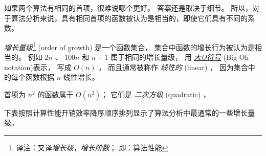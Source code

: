 
如果两个算法有相同的首项，很难说哪个更好。 答案还是取决于细节。
所以，对于算法分析来说，具有相同首项的函数被认为是相当的，即使它们具有不同的系数。


{\em 增长量级}\footnote{译注：又译{\em 增长级}，{\em 增长阶数}； 即：算法性能} (order of growth) 是一个函数集合， 集合中函数的增长行为被认为是相当的。
例如 $2n$ 、 $100n$ 和 $n+1$ 属于相同的增长量级，
用 \href{https://zh.wikipedia.org/wiki/%E5%A4%A7O%E7%AC%A6%E5%8F%B7}{{\em 大{\em O}符号}} (Big-Oh notation)表示， 写成 $O(n)$ ，
而且通常被称作 {\em 线性的} (linear) ，
因为集合中的每个函数根据 $n$ 线性增长。
  


首项为 $n^2$ 的函数属于 $O(n^2)$；  它们是 {\em 二次方级} (quadratic) ，



下表按照计算性能开销效率降序顺序排列显示了算法分析中最通常的一些增长量级。


